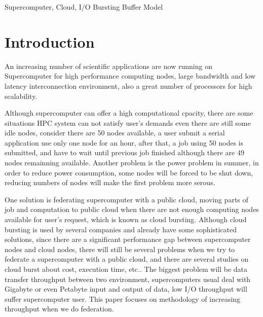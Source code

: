 \begin{keyword}
Supercomputer, Cloud, I/O Bursting Buffer Model
\end{keyword}

\maketitle

\section{Introduction}
An increasing number of scientific applications are now running on Supercomputer for high performance computing nodes, large bandwidth and low latency interconnection environment, also a great number of processors for high scalability.

Although supercomputer can offer a high computational cpacity, there are some situations HPC system can not satisfy user's demands even there are still some idle nodes, consider there are 50 nodes available, a user submit a serial application use only one node for an hour, after that, a job using 50 nodes is submitted, and have to wait until previous job finished although there are 49 nodes remainning available.
Another problem is the power problem in summer, in order to reduce power consumption, some nodes will be forced to be shut down, reducing numbers of nodes will make the first problem more serous.

One solution is federating supercomputer with a public cloud, moving parts of job and computation to public cloud when there are not enough computing nodes available for user's request, which is known as cloud bursting.
Although cloud bursting is used by several companies and already have some sophisticated solutions\cite{Eucalyptus,stratos,Seagull}, since there are a significant performance gap between supercomputer nodes and cloud nodes, there will still be several problems when we try to federate a supercomputer with a public cloud, and there are several studies on cloud burst about cost\cite{Seagull}, execution time\cite{time_and_cost}, etc..
The biggest problem will be data transfer throughput between two environment, supercomputers usual deal with Gigabyte or even Petabyte input and output of data, low I/O throughput will suffer supercomputer user. This paper focuses on methodology of increasing throughput when we do federation.

